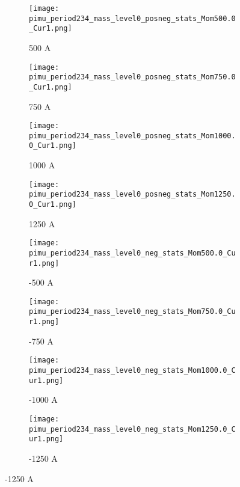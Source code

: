  \begin{figure}[h]	
 \centering   
            \begin{subfigure}[b]{0.24\textwidth}
            \centering
            \texttt{[image: pimu\_period234\_mass\_level0\_posneg\_stats\_Mom500.0\_Cur1.png]}
            \caption{500 A}
            \label{fig_mpimu500}
            \end{subfigure}
             \hfill   
            \begin{subfigure}[b]{0.24\textwidth}
            \centering
            \texttt{[image: pimu\_period234\_mass\_level0\_posneg\_stats\_Mom750.0\_Cur1.png]}
            \caption{750 A}
            \label{fig_mpimu750}
            \end{subfigure}
             \hfill   
            \begin{subfigure}[b]{0.24\textwidth}
            \centering
            \texttt{[image: pimu\_period234\_mass\_level0\_posneg\_stats\_Mom1000.0\_Cur1.png]}
            \caption{1000 A}
            \label{fig_mpimu1000}
            \end{subfigure}
             \hfill                             
             \begin{subfigure}[b]{0.24\textwidth}
            \centering
            \texttt{[image: pimu\_period234\_mass\_level0\_posneg\_stats\_Mom1250.0\_Cur1.png]}
            \caption{1250 A}
            \label{fig_mpimu1250}
            \end{subfigure}
            
             \begin{subfigure}[b]{0.24\textwidth}
            \centering
            \texttt{[image: pimu\_period234\_mass\_level0\_neg\_stats\_Mom500.0\_Cur1.png]}
            \caption{-500 A}
            \label{fig_mpimu500}
            \end{subfigure}
             \hfill   
            \begin{subfigure}[b]{0.24\textwidth}
            \centering
            \texttt{[image: pimu\_period234\_mass\_level0\_neg\_stats\_Mom750.0\_Cur1.png]}
            \caption{-750 A}
            \label{fig_mpimu750}
            \end{subfigure}
             \hfill   
            \begin{subfigure}[b]{0.24\textwidth}
            \centering
            \texttt{[image: pimu\_period234\_mass\_level0\_neg\_stats\_Mom1000.0\_Cur1.png]}
            \caption{-1000 A}
            \label{fig_mpimu1000}
            \end{subfigure}
             \hfill                             
             \begin{subfigure}[b]{0.24\textwidth}
            \centering
            \texttt{[image: pimu\_period234\_mass\_level0\_neg\_stats\_Mom1250.0\_Cur1.png]}
            \caption{-1250 A}
            \label{fig_mpimu-1250}
            \end{subfigure}
            

\end{figure}
